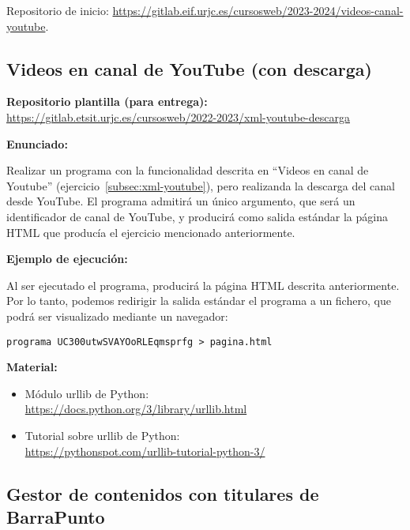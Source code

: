 Repositorio de inicio: \url{https://gitlab.eif.urjc.es/cursosweb/2023-2024/videos-canal-youtube}.

\subsection{Videos en canal de YouTube (con descarga)}
\label{subsec:xml-youtube-descarga}

\textbf{Repositorio plantilla (para entrega):} \\
\url{https://gitlab.etsit.urjc.es/cursosweb/2022-2023/xml-youtube-descarga}

\textbf{Enunciado:}

Realizar un programa con la funcionalidad descrita en ``Videos en canal de Youtube'' (ejercicio~\ref{subsec:xml-youtube}), pero realizanda la descarga del canal desde YouTube. El programa admitirá un único argumento, que será un identificador de canal de YouTube, y producirá como salida estándar la página HTML que producía el ejercicio mencionado anteriormente.

\textbf{Ejemplo de ejecución:}

Al ser ejecutado el programa, producirá la página HTML descrita anteriormente. Por lo tanto, podemos redirigir la salida estándar el programa a un fichero, que podrá ser visualizado mediante un navegador:

\begin{verbatim}
programa UC300utwSVAYOoRLEqmsprfg > pagina.html
\end{verbatim}

\textbf{Material:}

\begin{itemize}
\item Módulo urllib de Python: \\
  \url{https://docs.python.org/3/library/urllib.html}
\item Tutorial sobre urllib de Python: \\
  \url{https://pythonspot.com/urllib-tutorial-python-3/}
\end{itemize}

\subsection{Gestor de contenidos con titulares de BarraPunto}
\label{subsec:contentapp-barrapunto}

